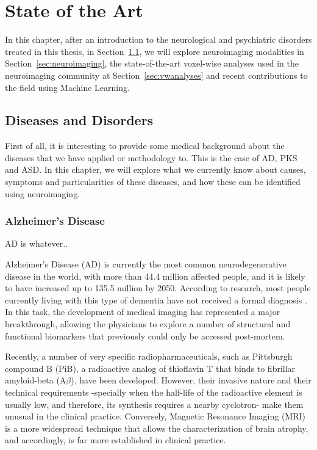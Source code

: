 \chapter{State of the Art}\label{ch:stateofart}
In this chapter, after an introduction to the neurological and psychiatric disorders treated in this thesis, in Section~\ref{sec:disorders}, we will explore neuroimaging modalities in Section~\ref{sec:neuroimaging}, the state-of-the-art voxel-wise analyses used in the neuroimaging community at Section~\ref{sec:vwanalyses} and recent contributions to the field using Machine Learning. 

\section{Diseases and Disorders}\label{sec:disorders}
First of all, it is interesting to provide some medical background about the diseases that we have applied or methodology to. This is the case of \ac{AD}, \ac{PKS} and \ac{ASD}. In this chapter, we will explore what we currently know about causes, symptoms and particularities of these diseases, and how these can be identified using neuroimaging. 


\subsection{Alzheimer's Disease}
\ac{AD} is whatever.. 

Alzheimer's Disease (AD) is currently the most common neurodegenerative disease in the world, with more than 44.4 million affected people, and it is likely to have increased up to 135.5 million by 2050. According to research, most people currently living with this type of dementia have not received a formal diagnosis \cite{ADInforme2013}. In this task, the development of medical imaging has represented a major breakthrough, allowing the physicians to explore a number of structural and functional biomarkers that previously could only be accessed post-mortem. 

Recently, a number of very specific radiopharmaceuticals, such as Pittsburgh compound B (PiB), a radioactive analog of thioflavin T that  binds to fibrillar amyloid-beta (A$\beta$), have been developed. However,  their invasive nature and their technical requirements -specially when the half-life of the radioactive element is usually low, and therefore, its synthesis requires a nearby cyclotron- make them unusual in the clinical practice. Conversely, Magnetic Resonance Imaging (MRI) is a more widespread technique that allows the characterization of brain atrophy, and accordingly, is far more established in clinical practice. 


